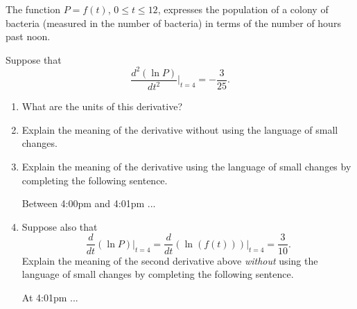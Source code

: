 \documentclass{ximera}
\begin{document}
\begin{question}  \label{Qghldfdfgng}
The function $P=f(t)$, $0\leq t \leq 12$, expresses the population of a colony of bacteria (measured in the number of bacteria) in terms of the number of hours past noon.

Suppose that
\begin{equation}
   \frac{d^2 \left(  \ln P \right)}{dt^2} \Big|_{t=4} =  -\frac{3}{25} .  %
\end{equation}


\begin{enumerate}
\item What are the units of this derivative?

\item Explain the meaning of the derivative without using the language of small changes.

\item Explain the meaning of the derivative using the language of small changes by completing the following sentence.

Between 4:00pm and 4:01pm  ...

\item Suppose also that
\[
   \frac{d}{dt} \left(  \ln P \right)\Big|_{t=4} = \frac{d}{dt} \left(  \ln (f(t)) \right)\Big|_{t=4}  = \frac{3}{10} .
\]
Explain the meaning of the second derivative above \emph{without} using the language of small changes by completing the following sentence.

At 4:01pm  ...

\end{enumerate}
\end{question}
\end{document}
